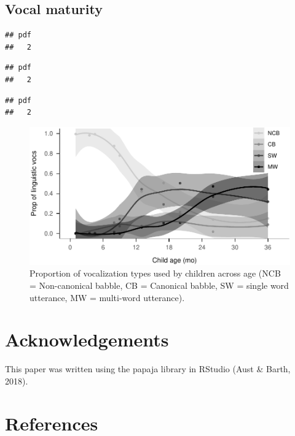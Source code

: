 \documentclass[,man,floatsintext]{apa6}
\begin{document}
\subsection{Vocal maturity}\label{vocal-maturity}

\begin{verbatim}
## pdf 
##   2
\end{verbatim}

\begin{verbatim}
## pdf 
##   2
\end{verbatim}

\begin{verbatim}
## pdf 
##   2
\end{verbatim}

\begin{figure}
\centering
\includegraphics{Yeli-CLE_files/figure-latex/fig6-1.pdf}
\caption{\label{fig:fig6}Proportion of vocalization types used by children
across age (NCB = Non-canonical babble, CB = Canonical babble, SW =
single word utterance, MW = multi-word utterance).}
\end{figure}

\section{Acknowledgements}\label{acknowledgements}

This paper was written using the papaja library in RStudio (Aust \&
Barth, 2018).

\newpage

\section{References}\label{refs}

\begingroup
\setlength{\parindent}{-0.5in} \setlength{\leftskip}{0.5in}
\end{document}
